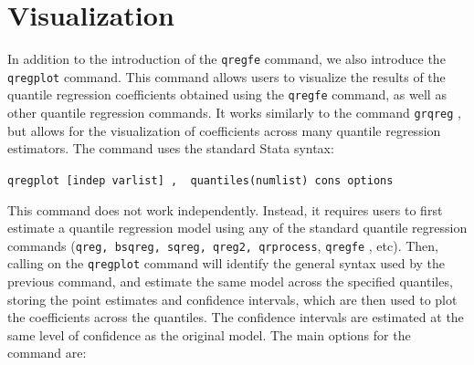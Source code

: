 \documentclass[bib]{statapress}
\begin{document}
\section{Visualization}\label{visualization}

In addition to the introduction of the \texttt{qregfe} command, we also
introduce the \texttt{qregplot} command. This command allows users to
visualize the results of the quantile regression coefficients obtained
using the \texttt{qregfe} command, as well as other quantile regression
commands. It works similarly to the command \texttt{grqreg}
\citep{grqreg}, but allows for the visualization of coefficients across
many quantile regression estimators. The command uses the standard Stata
syntax:

\texttt{qregplot\ {[}indep\ varlist{]}\ ,\ \ quantiles(numlist)\ cons\ options}

This command does not work independently. Instead, it requires users to
first estimate a quantile regression model using any of the standard
quantile regression commands
(\texttt{qreg,\ bsqreg,\ sqreg,\ qreg2,\ qrprocess}, \texttt{qregfe} ,
etc). Then, calling on the \texttt{qregplot} command will identify the
general syntax used by the previous command, and estimate the same model
across the specified quantiles, storing the point estimates and
confidence intervals, which are then used to plot the coefficients
across the quantiles. The confidence intervals are estimated at the same
level of confidence as the original model. The main options for the
command are:
\end{document}
